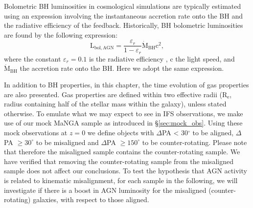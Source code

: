 Bolometric BH luminosities in cosmological simulations are typically estimated using an expression involving the instantaneous accretion rate onto the BH and the radiative efficiency of the feedback. Historically, BH bolometric luminosities are found by the following expression:
\begin{equation}
\mathrm{L_{bol, AGN}} = \frac{\varepsilon_r}{1 - \varepsilon_r} \dot{\mathrm{M}}_{\mathrm{BH}} \mathrm{c^2},
\end{equation}
where the constant $\varepsilon_r=0.1$ is the radiative efficiency \citep[see discussion in][]{habouzit2019}, c the light speed, and $\dot{\mathrm{M}}_{\mathrm{BH}}$ the accretion rate onto the BH. Here we adopt the same expression. 

In addition to BH properties, in this chapter, the time evolution of gas properties are also presented. Gas properties are defined within two effective radii ($\mathrm{R_{e}}$, radius containing half of the stellar mass within the galaxy), unless stated otherwise. To emulate what we may expect to see in IFS observations, we make use of our mock MaNGA sample as introduced in \S\ref{sec:mock_obs}. Using these mock observations at $z=0$ we define objects with $\Delta$PA < 30$^{\circ}$ to be aligned, $\Delta$PA $ \geq 30^{\circ}$ to be misaligned and $\Delta$PA $\geq 150^{\circ}$ to be counter-rotating. Please note that therefore the misaligned sample contains the counter-rotating sample. We have verified that removing the counter-rotating sample from the misaligned sample does not affect our conclusions. To test the hypothesis that AGN activity is related to kinematic misalignment, for each sample in the following, we will investigate if there is a boost in AGN luminosity for the misaligned (counter-rotating) galaxies, with respect to those aligned. 

